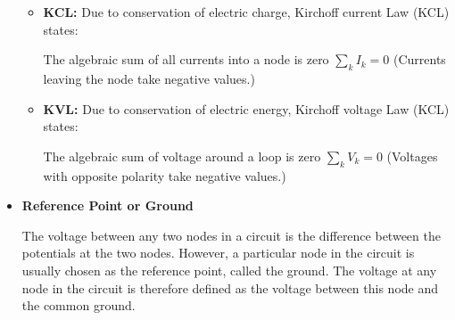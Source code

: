 \documentclass[12pt]{article}
\begin{document}
\begin{itemize}
      \begin{itemize} 
      \item {\bf KCL:} Due to conservation of electric charge, Kirchoff 
	current Law (KCL) states:
	
	The algebraic sum of all currents into a node is zero $\sum_k I_k =0$
	(Currents leaving the node take negative values.)
      \item {\bf KVL:} Due to conservation of electric energy, Kirchoff 
	voltage Law (KCL) states:

	The algebraic sum of voltage around a loop is zero $\sum_k V_k =0$
	(Voltages with opposite polarity take negative values.)

      \end{itemize}

    \item {\bf Reference Point or Ground}

      The voltage between any two nodes in a circuit is the difference between
      the potentials at the two nodes. However, a particular node in the
      circuit is usually chosen as the reference point, called the ground.
      The voltage at any node in the circuit is therefore defined as the 
      voltage between this node and the common ground.
      
\end{itemize}
\end{document}

